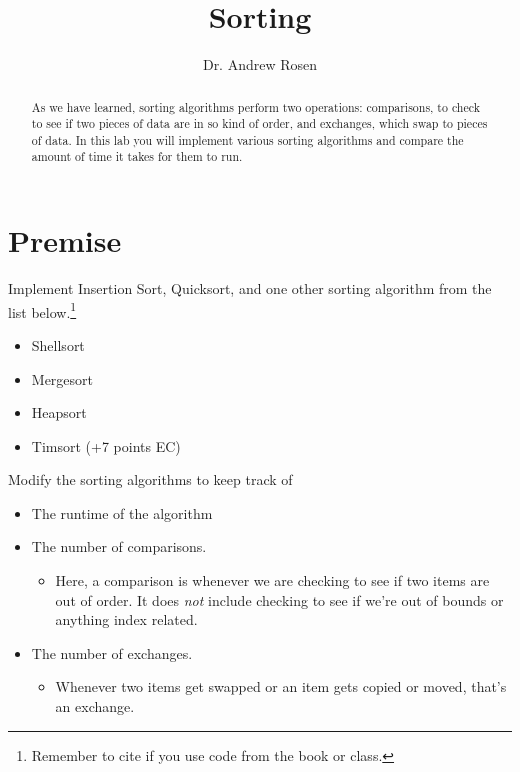 \documentclass[10pt,letterpaper]{article}
\author{Dr. Andrew Rosen}
\title{Sorting }
\date{}
\begin{document}
	
	\maketitle
	
	\begin{abstract}
		As we have learned, sorting algorithms perform two operations: comparisons, to check to see if two pieces of data are in so kind of order, and exchanges, which swap to pieces of data.
		In this lab you will implement various sorting algorithms and compare the amount of time it takes for them to run.
	\end{abstract}


	\section{Premise}
	Implement Insertion Sort, Quicksort, and one other sorting algorithm from the list below.\footnote{Remember to cite if you use code from the book or class.}
	\begin{itemize}
		\item Shellsort
		\item Mergesort
		\item Heapsort
		\item Timsort (+7 points EC)
	\end{itemize}
	
	Modify the sorting algorithms to keep track of
	\begin{itemize}
		\item The runtime of the algorithm
		\item The number of comparisons.
		\begin{itemize}
			\item Here, a comparison is whenever we are checking to see if two items are out of order.  It does \textit{not} include checking to see if we're out of bounds or anything index related.
		\end{itemize}
		\item The number of exchanges.
		\begin{itemize}
			\item Whenever two items get swapped or an item gets copied or moved, that's an exchange.
		\end{itemize}
	\end{itemize}
		
\end{document}
